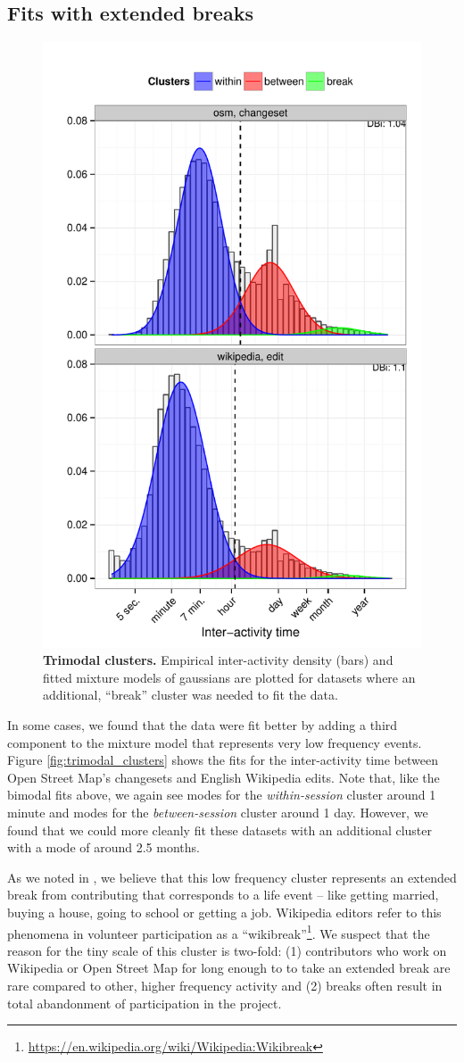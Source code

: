 \subsection{Fits with extended breaks}
\begin{figure}
\centering
\includegraphics[width=.45\textwidth]{figures/trimodal_clusters.pdf}
\caption{
    \textbf{Trimodal clusters.} Empirical inter-activity density (bars) and fitted mixture models of gaussians are plotted for datasets where an additional, ``break'' cluster was needed to fit the data.
}
\end{figure}
In some cases, we found that the data were fit better by adding a third component to the mixture model that represents very low frequency events.  Figure \ref{fig:trimodal_clusters} shows the fits for the inter-activity time between Open Street Map's changesets and English Wikipedia edits.  Note that, like the bimodal fits above, we again see modes for the \emph{within-session} cluster around 1 minute and modes for the \emph{between-session} cluster around 1 day.  However, we found that we could more cleanly fit these datasets with an additional cluster with a mode of around 2.5 months.

As we noted in \cite{geiger13using}, we believe that this low frequency cluster represents an extended break from contributing that corresponds to a life event -- like getting married, buying a house, going to school or getting a job.  Wikipedia editors refer to this phenomena in volunteer participation as a ``wikibreak''\footnote{\url{https://en.wikipedia.org/wiki/Wikipedia:Wikibreak}}.  We suspect that the reason for the tiny scale of this cluster is two-fold: (1) contributors who work on Wikipedia or Open Street Map for long enough to to take an extended break are rare compared to other, higher frequency activity and (2) breaks often result in total abandonment of participation in the project.

